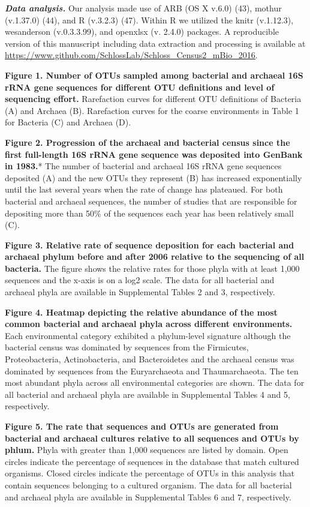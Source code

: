 \documentclass[11pt,]{article}
\begin{document}
\textbf{\emph{Data analysis.}} Our analysis made use of ARB (OS X v.6.0)
(43), mothur (v.1.37.0) (44), and R (v.3.2.3) (47). Within R we utilized
the knitr (v.1.12.3), wesanderson (v.0.3.3.99), and openxlsx (v. 2.4.0)
packages. A reproducible version of this manuscript including data
extraction and processing is available at
\url{https://www.github.com/SchlossLab/Schloss_Census2_mBio_2016}.

\newpage

\doublespacing

\textbf{Figure 1. Number of OTUs sampled among bacterial and archaeal
16S rRNA gene sequences for different OTU definitions and level of
sequencing effort.} Rarefaction curves for different OTU definitions of
Bacteria (A) and Archaea (B). Rarefaction curves for the coarse
environments in Table 1 for Bacteria (C) and Archaea (D).

\textbf{Figure 2. Progression of the archaeal and bacterial census since
the first full-length 16S rRNA gene sequence was deposited into GenBank
in 1983.}* The number of bacterial and archaeal 16S rRNA gene sequences
deposited (A) and the new OTUs they represent (B) has increased
exponentially until the last several years when the rate of change has
plateaued. For both bacterial and archaeal sequences, the number of
studies that are responsible for depositing more than 50\% of the
sequences each year has been relatively small (C).

\textbf{Figure 3. Relative rate of sequence deposition for each
bacterial and archaeal phylum before and after 2006 relative to the
sequencing of all bacteria.} The figure shows the relative rates for
those phyla with at least 1,000 sequences and the x-axis is on a log2
scale. The data for all bacterial and archaeal phyla are available in
Supplemental Tables 2 and 3, respectively.

\textbf{Figure 4. Heatmap depicting the relative abundance of the most
common bacterial and archaeal phyla across different environments.} Each
environmental category exhibited a phylum-level signature although the
bacterial census was dominated by sequences from the Firmicutes,
Proteobacteria, Actinobacteria, and Bacteroidetes and the archaeal
census was dominated by sequences from the Euryarchaeota and
Thaumarchaeota. The ten most abundant phyla across all environmental
categories are shown. The data for all bacterial and archaeal phyla are
available in Supplemental Tables 4 and 5, respectively.

\textbf{Figure 5. The rate that sequences and OTUs are generated from
bacterial and archaeal cultures relative to all sequences and OTUs by
phlum.} Phyla with greater than 1,000 sequences are listed by domain.
Open circles indicate the percentage of sequences in the database that
match cultured organisms. Closed circles indicate the percentage of OTUs
in this analysis that contain sequences belonging to a cultured
organism. The data for all bacterial and archaeal phyla are available in
Supplemental Tables 6 and 7, respectively.
\end{document}
